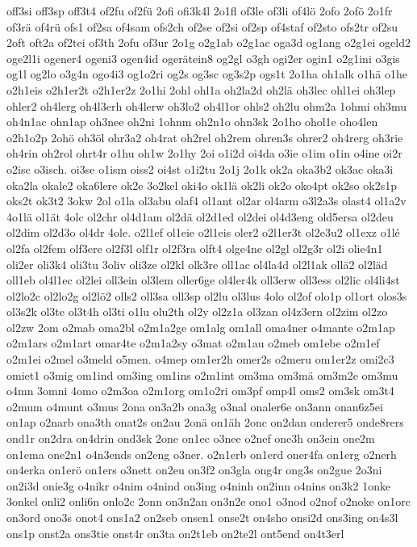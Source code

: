 {off3si
off3sp
off3t4
of2fu
of2fü
2ofi
ofi3k4l
2o1fl
of3le
of3li
of4lö
2ofo
2ofö
2o1fr
of3rä
of4rü
ofs1
of2sa
of4sam
ofs2ch
of2se
of2si
of2sp
of4staf
of2sto
ofs2tr
of2su
2oft
oft2a
of2tei
of3th
2ofu
of3ur
2o1g
o2g1ab
o2g1ac
oga3d
og1ang
o2g1ei
ogeld2
oge2l1i
ogener4
ogeni3
ogen4id
ogerätein8
og2gl
o3gh
ogi2er
ogin1
o2g1ini
o3gis
og1l
og2lo
o3g4n
ogo4i3
og1o2ri
og2s
og3sc
og3s2p
ogs1t
2o1ha
oh1alk
o1hä
o1he
o2h1eis
o2h1er2t
o2h1er2z
2o1hi
2ohl
ohl1a
oh2la2d
oh2lä
oh3lec
ohl1ei
oh3lep
ohler2
oh4lerg
oh4l3erh
oh4lerw
oh3lo2
oh4l1or
ohls2
oh2lu
ohm2a
1ohmi
oh3mu
oh4n1ac
ohn1ap
oh3nee
oh2ni
1ohnm
oh2n1o
ohn3sk
2o1ho
ohol1e
oho4len
o2h1o2p
2ohö
oh3öl
ohr3a2
oh4rat
oh2rel
oh2rem
ohren3s
ohrer2
oh4rerg
oh3rie
oh4rin
oh2rol
ohrt4r
o1hu
oh1w
2o1hy
2oi
o1i2d
oi4da
o3ie
o1im
o1in
o4ine
oi2r
o2isc
o3isch.
oi3se
o1ism
oiss2
oi4st
o1i2tu
2o1j
2o1k
ok2a
oka3b2
ok3ac
oka3i
oka2la
okale2
oka6lere
ok2e
3o2kel
oki4o
ok1lä
ok2li
ok2o
oko4pt
ok2so
ok2s1p
oks2t
ok3t2
3okw
2ol
o1la
ol3abu
olaf4
ol1ant
ol2ar
ol4arm
o3l2a3s
olast4
ol1a2v
4o1lä
ol1ät
4olc
ol2chr
ol4d1am
ol2dä
ol2d1ed
ol2dei
ol4d3eng
old5ersa
ol2deu
ol2dim
ol2d3o
ol4dr
4ole.
o2l1ef
ol1eie
o2l1eis
oler2
o2l1er3t
ol2e3u2
ol1exz
o1lé
ol2fa
ol2fem
olf3ere
ol2f3l
olf1r
ol2f3ra
olft4
olge4ne
ol2gl
ol2g3r
ol2i
olie4n1
oli2er
oli3k4
oli3tu
3oliv
oli3ze
ol2kl
olk3re
oll1ac
ol4la4d
ol2l1ak
ollä2
ol2läd
oll1eb
ol4l1ec
ol2lei
oll3ein
ol3lem
oller6ge
ol4ler4k
oll3erw
oll3ess
ol2lic
ol4li4st
ol2lo2c
ol2lo2g
ol2lö2
olls2
oll3sa
oll3sp
ol2lu
ol3lus
4olo
ol2of
olo1p
ol1ort
olos3s
ol3s2k
ol3te
ol3t4h
ol3ti
o1lu
olu2th
ol2y
ol2z1a
ol3zan
ol4z3ern
ol2zim
ol2zo
ol2zw
2om
o2mab
oma2bl
o2m1a2ge
om1alg
om1all
oma4ner
o4mante
o2m1ap
o2m1ars
o2m1art
omar4te
o2m1a2sy
o3mat
o2m1au
o2meb
om1ebe
o2m1ef
o2m1ei
o2mel
o3meld
o5men.
o4mep
om1er2h
omer2s
o2meru
om1er2z
omi2c3
omiet1
o3mig
om1ind
om3ing
om1ins
o2m1int
om3ma
om3mä
om3m2e
om3mu
o4mn
3omni
4omo
o2m3oa
o2m1org
om1o2ri
om3pf
omp4l
oms2
om3sk
om3t4
o2mum
o4munt
o3mus
2ona
on3a2b
ona3g
o3nal
onaler6e
on3ann
onan6z5ei
on1ap
o2narb
ona3th
onat2s
on2au
2onä
on1äh
2onc
on2dan
onderer5
onde8rers
ond1r
on2dra
on4drin
ond3sk
2one
on1ec
o3nee
o2nef
one3h
on3ein
one2m
on1ema
one2n1
o4n3ends
on2eng
o3ner.
o2n1erb
on1erd
oner4fa
on1erg
o2nerh
on4erka
on1erö
on1ers
o3nett
on2eu
on3f2
on3gla
ong4r
ong3s
on2gue
2o3ni
on2i3d
onie3g
o4nikr
o4nim
o4nind
on3ing
o4ninh
on2inn
o4nins
on3k2
1onke
3onkel
onli2
onli6n
onlo2c
2onn
on3n2an
on3n2e
ono1
o3nod
o2nof
o2noke
on1orc
on3ord
ono3s
onot4
ons1a2
on2seb
onsen1
onse2t
on4sho
onsi2d
ons3ing
on4s3l
ons1p
onst2a
ons3tie
onst4r
on3ta
on2t1eb
on2te2l
ont5end
on4t3erl
}
